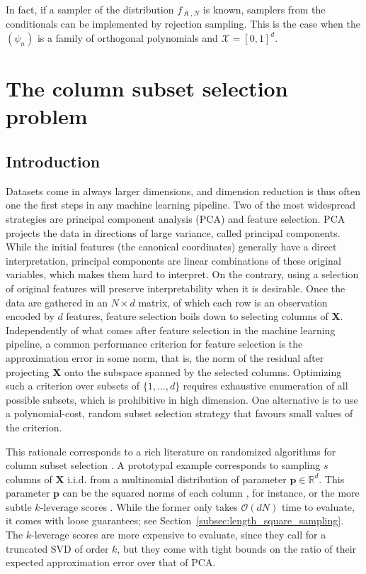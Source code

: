 \documentclass[twoside,11pt]{book}
\numberwithin{theorem}{chapter}
\numberwithin{definition}{chapter}
\numberwithin{proposition}{chapter}
\numberwithin{corollary}{chapter}
\numberwithin{example}{chapter}
\numberwithin{lemma}{chapter}
\DeclareMathOperator*{\KDPP}{\mathfrak{K}}
\begin{document}
In fact, if a sampler of the distribution $f_{\KDPP,N}$ is known, samplers from the conditionals can be implemented by rejection sampling. This is the case when the $(\psi_{n})$ is a family of orthogonal polynomials and $\mathcal{X} = [0,1]^{d}$.  

\clearpage
\chapter{The column subset selection problem}\label{chapter:cssp}
\section{Introduction}



Datasets come in always larger dimensions, and dimension reduction is thus often one the first steps in any machine learning pipeline. Two of the most widespread strategies are principal component analysis (PCA) and feature selection. PCA projects the data in directions of large variance, called principal components. While the initial features (the canonical coordinates) generally have a direct interpretation, principal components are linear combinations of these original variables, which makes them hard to interpret. On the contrary, using a selection of original features will preserve interpretability when it is desirable. Once the data are gathered in an $N\times d$ matrix, of which each row is an observation encoded by $d$ features, feature selection boils down to selecting columns of $\bm{X}$. Independently of what comes after feature selection in the machine learning pipeline, a common performance criterion for feature selection is the approximation error in some norm, that is, the norm of the residual after projecting $\bm{X}$ onto the subspace spanned by the selected columns. Optimizing such a criterion over subsets of $\{1,\dots,d\}$ requires exhaustive enumeration of all possible subsets, which is prohibitive in high dimension. One alternative is to use a polynomial-cost, random subset selection strategy that favours small values of the criterion.
%

This rationale corresponds to a rich literature on randomized algorithms for column subset selection \citep{DeVe06,DrMaMu07,BoDrMI11}. A prototypal example corresponds to sampling $s$ columns of $\bm{X}$ i.i.d. from a multinomial distribution of parameter $\bm{p} \in \mathbb{R}^{d}$. This parameter $\bm{p}$ can be the squared norms of each column \citep{DFKVV04}, for instance, or the more subtle $k$-leverage scores \citep{DrMaMu07}. While the former only takes $\mathcal{O}(d N)$ time to evaluate, it comes with loose guarantees; see Section~\ref{subsec:length_square_sampling}. The $k$-leverage scores are more expensive to evaluate, since they call for a truncated SVD of order $k$, but they come with tight bounds on the ratio of their expected approximation error over that of PCA.
\end{document}
